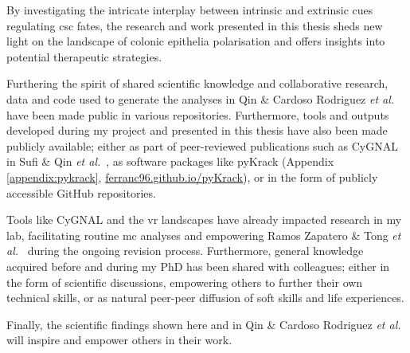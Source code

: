 \begin{impactstatement}


By investigating the intricate interplay between intrinsic and extrinsic cues regulating \acrshort{csc} fates, the research and work presented in this thesis sheds new light on the landscape of colonic epithelia polarisation and offers insights into potential therapeutic strategies. 

Furthering the spirit of shared scientific knowledge and collaborative research, data and code used to generate the analyses in Qin \& Cardoso Rodriguez \emph{et al.} have been made public in various repositories. Furthermore, tools and outputs developed during my project and presented in this thesis have also been made publicly available; either as part of peer-reviewed publications such as CyGNAL in Sufi \& Qin \emph{et al.}~\cite{sufi_multiplexed_2021}, as software packages like pyKrack (Appendix \ref{appendix:pykrack}, \url{ferranc96.github.io/pyKrack}), or in the form of publicly accessible GitHub repositories. 

Tools like CyGNAL and the \acrshort{vr} landscapes have already impacted research in my lab, facilitating routine \acrshort{mc} analyses and empowering Ramos Zapatero \& Tong \emph{et al.}~\cite{zapatero_trellis_2023} during the ongoing revision process. Furthermore, general knowledge acquired before and during my PhD has been shared with colleagues; either in the form of scientific discussions, empowering others to further their own technical skills, or as natural peer-peer diffusion of soft skills and life experiences.

Finally, the scientific findings shown here and in Qin \& Cardoso Rodriguez \emph{et al.}~\cite{cardoso_rodriguez_single-cell_2023} will inspire and empower others in their work.



\end{impactstatement}
